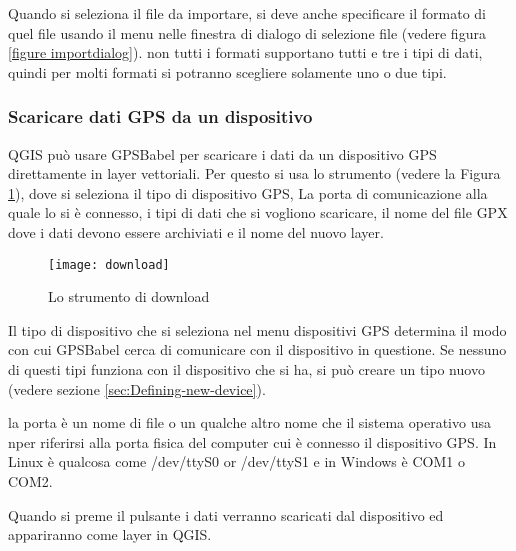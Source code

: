 Quando si seleziona il file da importare, si deve anche specificare il formato di quel file usando il menu nelle finestra di dialogo di selezione file (vedere figura \ref{figure importdialog}). non tutti i formati supportano tutti e tre i tipi di dati, quindi per molti formati si potranno scegliere solamente uno o due tipi.


\subsubsection{Scaricare dati GPS da un dispositivo}

QGIS può usare GPSBabel per scaricare i dati da un dispositivo GPS direttamente in layer vettoriali.
Per questo si usa lo strumento  (vedere la Figura \ref{figure_download}), dove si seleziona il tipo di dispositivo GPS, La porta di comunicazione alla quale lo si è connesso, i tipi di dati che si vogliono scaricare, il nome del file GPX dove i dati devono essere archiviati e il nome del nuovo layer.

\begin{figure}[ht]
   \begin{center}
\caption{\label{figure_download}Lo strumento di download \nixcaption}
\texttt{[image: download]}
   \end{center}
\end{figure}


Il tipo di dispositivo che si seleziona nel menu dispositivi GPS determina il modo con cui GPSBabel cerca di comunicare con il dispositivo in questione. Se nessuno di questi tipi funziona con il dispositivo che si ha, si può creare un tipo nuovo (vedere sezione \ref{sec:Defining-new-device}).

la porta è un nome di file o un qualche altro nome che il sistema operativo usa nper riferirsi alla porta fisica del computer cui è connesso il dispositivo GPS.
\nix In Linux è qualcosa come /dev/ttyS0 or /dev/ttyS1 e in \win Windows è COM1 o COM2.

Quando si preme il pulsante  i dati verranno scaricati dal dispositivo ed appariranno come layer in QGIS.

